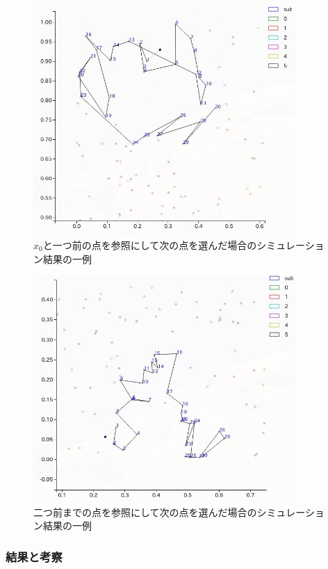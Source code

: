 \begin{figure}[H]
    \begin{center}
        \includegraphics[width=10cm]{../simple3/case_4.jpg}
        \caption{$x_{0}$と一つ前の点を参照にして次の点を選んだ場合のシミュレーション結果の一例}
        \label{fig:f11}
    \end{center}
\end{figure}
\begin{figure}[H]
    \begin{center}
        \includegraphics[width=10cm]{../simple3/case_5.jpg}
        \caption{二つ前までの点を参照にして次の点を選んだ場合のシミュレーション結果の一例}
        \label{fig:f12}
    \end{center}
\end{figure}

\subsubsection{結果と考察}

